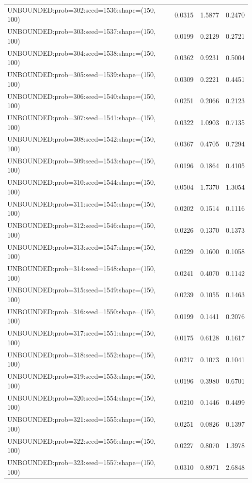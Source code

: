 \begin{longtable}{lccc}
UNBOUNDED:prob=302:seed=1536:shape=(150, 100) &   0.0315 &  1.5877 &  0.2470 \\
UNBOUNDED:prob=303:seed=1537:shape=(150, 100) &   0.0199 &  0.2129 &  0.2721 \\
UNBOUNDED:prob=304:seed=1538:shape=(150, 100) &   0.0362 &  0.9231 &  0.5004 \\
UNBOUNDED:prob=305:seed=1539:shape=(150, 100) &   0.0309 &  0.2221 &  0.4451 \\
UNBOUNDED:prob=306:seed=1540:shape=(150, 100) &   0.0251 &  0.2066 &  0.2123 \\
UNBOUNDED:prob=307:seed=1541:shape=(150, 100) &   0.0322 &  1.0903 &  0.7135 \\
UNBOUNDED:prob=308:seed=1542:shape=(150, 100) &   0.0367 &  0.4705 &  0.7294 \\
UNBOUNDED:prob=309:seed=1543:shape=(150, 100) &   0.0196 &  0.1864 &  0.4105 \\
UNBOUNDED:prob=310:seed=1544:shape=(150, 100) &   0.0504 &  1.7370 &  1.3054 \\
UNBOUNDED:prob=311:seed=1545:shape=(150, 100) &   0.0202 &  0.1514 &  0.1116 \\
UNBOUNDED:prob=312:seed=1546:shape=(150, 100) &   0.0226 &  0.1370 &  0.1373 \\
UNBOUNDED:prob=313:seed=1547:shape=(150, 100) &   0.0229 &  0.1600 &  0.1058 \\
UNBOUNDED:prob=314:seed=1548:shape=(150, 100) &   0.0241 &  0.4070 &  0.1142 \\
UNBOUNDED:prob=315:seed=1549:shape=(150, 100) &   0.0239 &  0.1055 &  0.1463 \\
UNBOUNDED:prob=316:seed=1550:shape=(150, 100) &   0.0199 &  0.1441 &  0.2076 \\
UNBOUNDED:prob=317:seed=1551:shape=(150, 100) &   0.0175 &  0.6128 &  0.1617 \\
UNBOUNDED:prob=318:seed=1552:shape=(150, 100) &   0.0217 &  0.1073 &  0.1041 \\
UNBOUNDED:prob=319:seed=1553:shape=(150, 100) &   0.0196 &  0.3980 &  0.6701 \\
UNBOUNDED:prob=320:seed=1554:shape=(150, 100) &   0.0210 &  0.1446 &  0.4499 \\
UNBOUNDED:prob=321:seed=1555:shape=(150, 100) &   0.0251 &  0.0826 &  0.1397 \\
UNBOUNDED:prob=322:seed=1556:shape=(150, 100) &   0.0227 &  0.8070 &  1.3978 \\
UNBOUNDED:prob=323:seed=1557:shape=(150, 100) &   0.0310 &  0.8971 &  2.6848 \\

\end{longtable}
